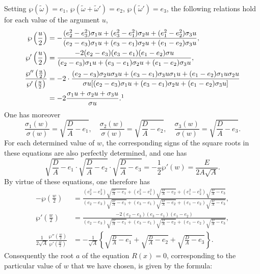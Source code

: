 \documentclass{article}
\begin{document}
Setting $\wp(\tilde{\omega}) = e_1$, $\wp(\tilde{\omega} + \tilde{\omega}') = e_2$, $\wp(\tilde{\omega}') = e_3$, the following relations hold for each value of the argument $u$,
\begin{align*}
\wp\left(\frac{u}{2}\right) &= -\frac{(e_2^2 - e_3^2)\sigma_1 u + (e_3^2 - e_1^2)\sigma_2 u + (e_1^2 - e_2^2)\sigma_3 u}{(e_2 - e_3)\sigma_1 u + (e_3 - e_1)\sigma_2 u + (e_1 - e_2)\sigma_3 u}, \\
\wp'\left(\frac{u}{2}\right) &= \frac{-2(e_2 - e_3)(e_3 - e_1)(e_1 - e_2)\sigma u}{(e_2 - e_3)\sigma_1 u + (e_3 - e_1)\sigma_2 u + (e_1 - e_2)\sigma_3 u}, \\
\frac{\wp''\left(\frac{u}{2}\right)}{\wp'\left(\frac{u}{2}\right)} &= -2\cdot\frac{(e_2 - e_3)\sigma_2 u\sigma_3 u + (e_3 - e_1)\sigma_3 u\sigma_1 u + (e_1 - e_2)\sigma_1 u\sigma_2 u}{\sigma u[(e_2 - e_3)\sigma_1 u + (e_3 - e_1)\sigma_2 u + (e_1 - e_2)\sigma_3 u]} \\
&= -2\frac{\sigma_1 u + \sigma_2 u + \sigma_3 u}{\sigma u}.\footnotemark
\end{align*}
One has moreover
\[
\frac{\sigma_1(w)}{\sigma(w)} = \sqrt{\frac{D}{A} - e_1}, \quad \frac{\sigma_2(w)}{\sigma(w)} = \sqrt{\frac{D}{A} - e_2}, \quad \frac{\sigma_3(w)}{\sigma(w)} = \sqrt{\frac{D}{A} - e_3}.
\]
For each determined value of $w$, the corresponding signs of the square roots in these equations are also perfectly determined, and one has
\[
\sqrt{\frac{D}{A} - e_1} \cdot \sqrt{\frac{D}{A} - e_2} \cdot \sqrt{\frac{D}{A} - e_3} = -\frac{1}{2}\wp'(w) = \frac{E}{2A\sqrt{A}}.
\]
By virtue of these equations, one therefore has
\begin{align*}
-\wp\left(\frac{w}{2}\right) &= \frac{(e_2^2 - e_3^2)\sqrt{\frac{D}{A} - e_1} + (e_3^2 - e_1^2)\sqrt{\frac{D}{A} - e_2} + (e_1^2 - e_2^2)\sqrt{\frac{D}{A} - e_3}}{(e_2 - e_3)\sqrt{\frac{D}{A} - e_1} + (e_3 - e_1)\sqrt{\frac{D}{A} - e_2} + (e_1 - e_2)\sqrt{\frac{D}{A} - e_3}}, \\
\wp'\left(\frac{w}{2}\right) &= \frac{-2(e_2 - e_3)(e_3 - e_1)(e_1 - e_2)}{(e_2 - e_3)\sqrt{\frac{D}{A} - e_1} + (e_3 - e_1)\sqrt{\frac{D}{A} - e_2} + (e_1 - e_2)\sqrt{\frac{D}{A} - e_3}}, \\
\frac{1}{2\sqrt{A}}\frac{\wp''\left(\frac{w}{2}\right)}{\wp'\left(\frac{w}{2}\right)} &= -\frac{1}{\sqrt{A}}\left\{\sqrt{\frac{D}{A} - e_1} + \sqrt{\frac{D}{A} - e_2} + \sqrt{\frac{D}{A} - e_3}\right\}.
\end{align*}
Consequently the root $a$ of the equation $R(x) = 0$, corresponding to the particular value of $w$ that we have chosen, is given by the formula:
\end{document}
